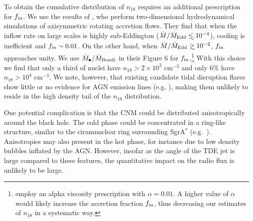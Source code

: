\documentclass[usenatbib,fleqn]{mnras}
\newcommand\lsim{\mathrel{\rlap{\lower4pt\hbox{\hskip1pt$\sim$}}
    \raise1pt\hbox{$<$}}}
\newcommand\gsim{\mathrel{\rlap{\lower4pt\hbox{\hskip1pt$\sim$}}
    \raise1pt\hbox{$>$}}}
\begin{document}
To obtain the cumulative distribution of $n_{18}$ requires an additional prescription for $f_{\rm in}$.  We use the results of \citet{Li+2013}, who perform two-dimensional hydrodynamical simulations of axisymmetric
rotating accretion flows.  They find that when the inflow rate on large scales is highly sub-Eddington ($\dot{M}/\dot{M}_{\rm Edd} \lsim 10^{-4}$), cooling is inefficient and $f_{\rm in}\sim 0.01$. On the
other hand, when $\dot{M}/\dot{M}_{\rm Edd}\gsim 10^{-2}$, $f_{\rm in}$ approaches unity.  We use $\dot{M}_{\bullet}/\dot{M}_{\rm Bondi}$ in their Figure 6 for $f_{\rm in}$.\footnote{\citet{Li+2013} employ an alpha viscosity prescription with $\alpha=0.01$.  A higher value of $\alpha$ would likely increase the accretion fraction $f_{\rm in}$, thus decreasing our estimates of $n_{18}$ in a systematic way.}  With this choice we find that only a third of nuclei have $n_{18}>2\times 10^{3}$ cm$^{-3}$ and only 6\% have $n_{18}>10^{4}$ cm$^{-3}$.  We note, however, that existing candidate tidal disruption flares show little or no evidence for AGN emission lines (e.g. \citealt{van-Velzen+2011, Arcavi+2014}), making them unlikely to reside in the high density tail of the $n_{18}$ distribution. 


One potential complication is that the CNM could be distributed anisotropically around the black hole.  The cold phase could be concentrated in a ring-like structure, similar to the cirumnuclear ring surrounding SgrA$^{*}$ (e.g.~\citealt{Lau+13}).  Anisotropies may also present in the hot phase, for instance due to low density bubbles inflated by the AGN.  However, insofar as the angle of the TDE jet is large compared to these features, the quantitative impact on the radio flux is unlikely to be large.  

\end{document}
